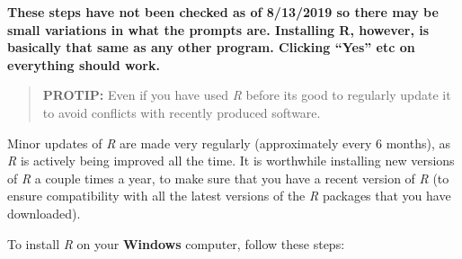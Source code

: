 \documentclass[
]{book}
\begin{document}
\textbf{These steps have not been checked as of 8/13/2019 so there may be small variations in what the prompts are. Installing R, however, is basically that same as any other program. Clicking ``Yes'' etc on everything should work.}

\begin{quote}
\textbf{PROTIP:} Even if you have used \emph{R} before its good to regularly update it to avoid conflicts with recently produced software.
\end{quote}

Minor updates of \emph{R} are made very regularly (approximately every 6 months), as \emph{R} is actively being improved all the time. It is worthwhile installing new versions of \emph{R} a couple times a year, to make sure that you have a recent version of \emph{R} (to ensure compatibility with all the latest versions of the \emph{R} packages that you have downloaded).

To install \emph{R} on your \textbf{Windows} computer, follow these steps:
\end{document}
